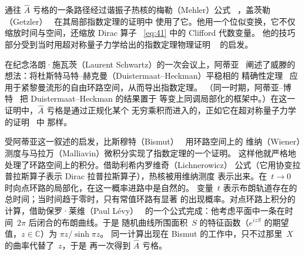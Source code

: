 \documentclass[11pt]{amsart}
\theoremstyle{definition}
\theoremstyle{remark}
\theoremstyle{plain}
\numberwithin{equation}{section}
\renewcommand{\:}{\colon}
\newcommand{\Ahat}{{\hat A}}
\newcommand{\CC}{{\mathbb C}}
\begin{document}
通往 $\Ahat$ 亏格的一条路径经过谐振子热核的梅勒（Mehler）公式
~\cite[p.~19]{GJ}，盖茨勒（Getzler）~\cite{Ge2} 在其局部指数定理的证明中
使用了它。他用一个位似变换，它不仅缩放时间与空间，还缩放 Dirac 算子
~\eqref{eq:41} 中的 Clifford 代数变量。
他的技巧部分受到当时用超对称量子力学给出的指数定理物理证明
~\cite{Wi1,Ag,FW,Ge1} 的启发。

在纪念洛朗·施瓦茨（Laurent Schwartz）的一次会议上，阿蒂亚~\cite{A6}
阐述了威滕的想法：将杜斯特马特–赫克曼（Duistermaat–Heckman）平稳相的
精确性定理~\cite{DH} 应用于紧黎曼流形的自由环路空间，从而导出指数定理。
（同一时期，阿蒂亚–博特~\cite{AB5} 把 Duistermaat–Heckman 的结果置于
等变上同调局部化的框架中。）在这一证明中，$\Ahat$ 亏格是通过正规化某个
无穷乘积而进入的，正如它在超对称量子力学的证明~\cite[\S1.2.4]{Wi2} 中
那样。

受阿蒂亚这一叙述的启发，比斯穆特（Bismut）~\cite{Bi1} 用环路空间上的
维纳（Wiener）测度与马拉万（Malliavin）微积分实现了指数定理的一个证明。
这样他就严格地处理了环路空间上的积分。借助利希内罗维奇（Lichnerowicz）
公式（它用协变拉普拉斯算子表示 Dirac 拉普拉斯算子），热核被用维纳测度
表示出来。在~$t\to0$ 时向点环路的局部化，在这一概率进路中是自然的。
变量~$t$ 表示布朗轨道存在的总时间；当时间趋于零时，只有常值环路有显著
的出现概率。对点环路上积分的计算，借助保罗·莱维（Paul Lévy）~\cite{L}
的一个公式完成：他考虑平面中一条在时间~$2\pi $ 后闭合的布朗曲线。于是
随机曲线所围面积~$S$ 的特征函数（$e^{izS}$ 的期望值，$z\in \CC$）为
$\pi z/\sinh \pi z$。
同一计算出现在 Bismut 的工作中，只不过那里~$X$ 的曲率代替了~$z$，于是
再一次得到 $\Ahat$ 亏格。
\end{document}
